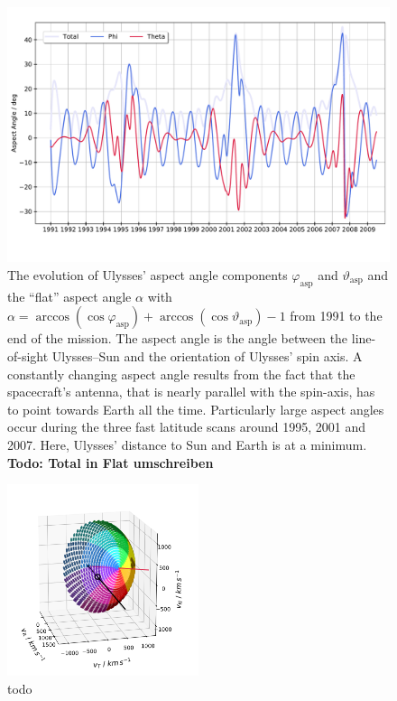 \begin{figure}[h]
	\includegraphics[width=1\textwidth]{Figures/aa_new.pdf}
	\centering
	\caption{The evolution of Ulysses' aspect angle components $\varphi_{\mathrm{asp}}$ and $\vartheta_{\mathrm{asp}}$ and the ``flat'' aspect angle $\alpha$ with  $\alpha = \arccos(\cos{\varphi_{\mathrm{asp}}}) + \arccos(\cos{\vartheta_{\mathrm{asp}}}) -1$ from 1991 to the end of the mission. The aspect angle is the angle between the line-of-sight Ulysses--Sun and the orientation of Ulysses' spin axis. A constantly changing aspect angle results from the fact that the spacecraft's antenna, that is nearly parallel with the spin-axis, has to point towards Earth all the time. Particularly large aspect angles occur during the three fast latitude scans around 1995, 2001 and 2007. Here, Ulysses' distance to Sun and Earth is at a minimum. \textbf{Todo: Total in Flat umschreiben}}
	\label{fig:aa}
\end{figure}
\begin{figure}[h]
	\includegraphics[width=0.5\textwidth]{Figures/col_aa_marker.png}
	\centering
	\caption{todo}
	\label{fig:col_aa}
\end{figure}
